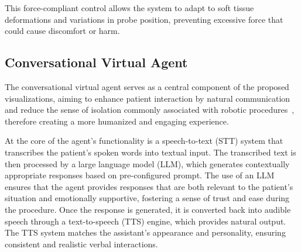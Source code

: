 This force-compliant control  allows the system to adapt to soft tissue deformations and variations in probe position, preventing excessive force that could cause discomfort or harm. 


\subsection{Conversational Virtual Agent}

The conversational virtual agent serves as a central component of the proposed visualizations, aiming to enhance patient interaction by natural communication and reduce the sense of isolation commonly associated with robotic procedures~\cite{almeras2019operating}, therefore creating a more humanized and engaging experience.

At the core of the agent’s functionality is a speech-to-text (STT) system that transcribes the patient’s spoken words into textual input. The transcribed text is then processed by a large language model (LLM), which generates contextually appropriate responses based on pre-configured prompt. The use of an LLM ensures that the agent provides responses that are both relevant to the patient’s situation and emotionally supportive, fostering a sense of trust and ease during the procedure.
Once the response is generated, it is converted back into audible speech through a text-to-speech (TTS) engine, which provides natural output. The TTS system matches the assistant’s appearance and personality, ensuring consistent and realistic verbal interactions. 

